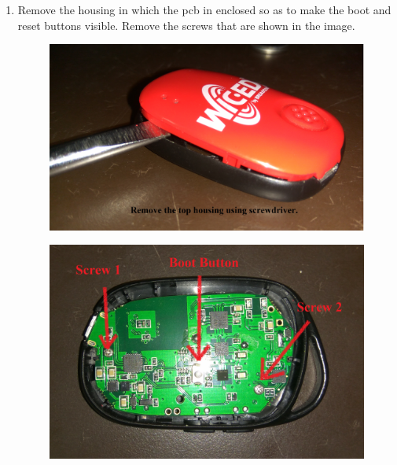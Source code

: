\documentclass[11pt,a4paper]{article}
\begin{document}
\begin{enumerate}
	  \newpage
	  \item Remove the housing in which the pcb in enclosed so as to make the boot and reset buttons visible. Remove the screws that are shown in the image.
	  
	  \begin{figure}[h]
        \centering
    	\includegraphics[scale=0.05]{4.jpg}
    	\caption{}
	    \end{figure}
	    
	    \begin{figure}[h]
        \centering
    	\includegraphics[scale=0.08]{5.jpg}
    	\caption{}
	    \end{figure}
	    

\end{enumerate}
\end{document}
